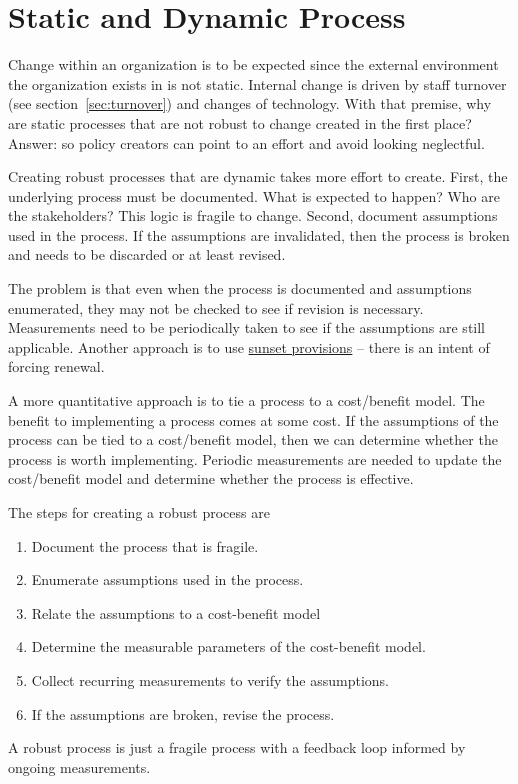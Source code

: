 \section{Static and Dynamic Process\label{sec:static-dynamic_processes}}


Change within an organization is to be expected since the external environment the organization exists in is not static. Internal change is driven by staff turnover (see section~\ref{sec:turnover}) and changes of technology. With that premise, why are static processes that are not robust to change created in the first place? Answer: so policy creators can point to an effort and avoid looking neglectful.

Creating robust processes that are dynamic takes more effort to create. First, the underlying process must be documented. What is expected to happen? Who are the stakeholders? This logic is fragile to change. Second, document assumptions used in the process. If the assumptions are invalidated, then the process is broken and needs to be discarded or at least revised. 

The problem is that even when the process is documented and assumptions enumerated, they may not be checked to see if revision is necessary. Measurements need to be periodically taken to see if the assumptions are still applicable. Another approach is to use \href{https://en.wikipedia.org/wiki/Sunset_provision}{sunset provisions} -- there is an intent of forcing renewal. 

A more quantitative approach is to tie a process to a cost/benefit model. The benefit to implementing a process comes at some cost. If the assumptions of the process can be tied to a cost/benefit model, then we can determine whether the process is worth implementing. Periodic measurements are needed to update the cost/benefit model and determine whether the process is effective.

The steps for creating a robust process are
\begin{enumerate}
    \item Document the process that is fragile.
    \item Enumerate assumptions used in the process. 
    \item Relate the assumptions to a cost-benefit model
    \item Determine the measurable parameters of the cost-benefit model. 
    \item Collect recurring measurements to verify the assumptions. 
    \item If the assumptions are broken, revise the process. 
\end{enumerate}
A robust process is just a fragile process with a feedback loop informed by ongoing measurements. 